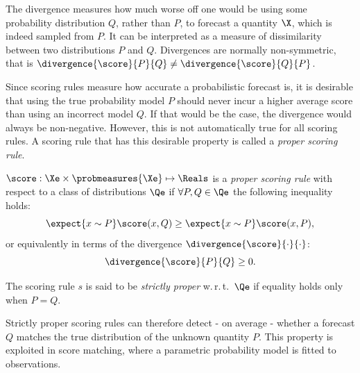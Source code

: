 The divergence measures how much worse off one would be using some probability distribution $Q$, rather than $P$, to forecast a quantity $\X$, which is indeed sampled from $P$. It can be interpreted as a measure of dissimilarity between two distributions $P$ and $Q$. Divergences are normally non-symmetric, that is $\divergence{\score}{P}{Q} \neq \divergence{\score}{Q}{P}$.

Since scoring rules measure how accurate a probabilistic forecast is, it is desirable that using the true probability model $P$ should never incur a higher average score than using an incorrect model $Q$. If that would be the case, the divergence would always be non-negative. However, this is not automatically true for all scoring rules. A scoring rule that has this desirable property is called a \emph{proper scoring rule}.

\begin{definition}\label{def:strictly_proper}
	$\score:\Xe\times\probmeasures{\Xe}\mapsto\Reals$ is a \emph{proper scoring rule} with respect to a class of distributions $\Qe$ if $\forall P,Q\in\Qe$ the following inequality holds:
	\begin{equation}
		\expect{x\sim P} \score(x,Q) \geq \expect{x\sim P} \score(x,P),
	\end{equation}
	or equivalently in terms of the divergence $\divergence{\score}{\cdot}{\cdot}$:
	\begin{equation}
		\divergence{\score}{P}{Q} \geq 0.
	\end{equation}
	
	The scoring rule $s$ is said to be \emph{strictly proper} w.\,r.\,t.\ $\Qe$ if equality holds only when $P=Q$.
\end{definition}

Strictly proper scoring rules can therefore detect - on average - whether a forecast $Q$ matches the true distribution of the unknown quantity $P$. This property is exploited in score matching, where a parametric probability model is fitted to \iid observations.

